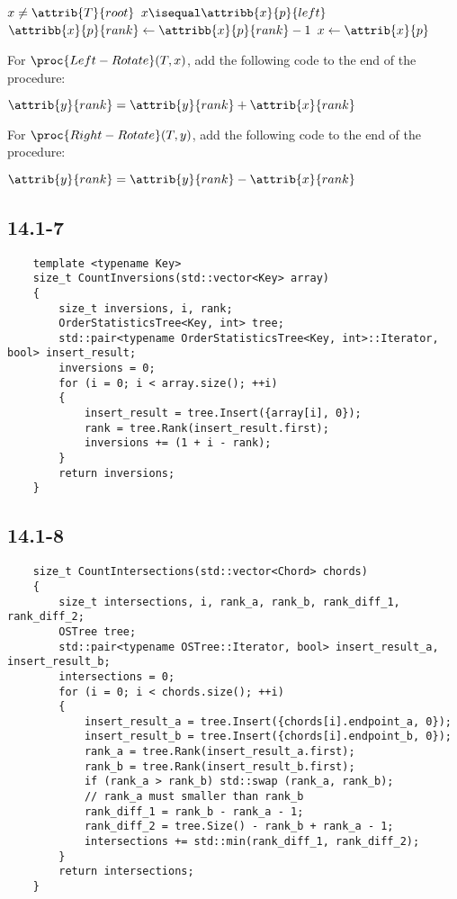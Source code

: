\begin{codebox}
    \li \While $x \neq \attrib{T}{root}$
    \li \Do
        \If $x \isequal \attribb{x}{p}{left}$
    \li \Then
            $\attribb{x}{p}{rank} \gets \attribb{x}{p}{rank} - 1$
        \End
    \li $x \gets \attrib{x}{p}$
        \End
\end{codebox}

\noindent
For $\proc{Left-Rotate}(T, x)$,
add the following code to the end of the procedure:

\begin{codebox}
    \zi $\attrib{y}{rank} = \attrib{y}{rank} + \attrib{x}{rank}$
\end{codebox}

\noindent
For $\proc{Right-Rotate}(T, y)$,
add the following code to the end of the procedure:

\begin{codebox}
    \zi $\attrib{y}{rank} = \attrib{y}{rank} - \attrib{x}{rank}$
\end{codebox}

\subsection*{14.1-7}

\begin{verbatim}
    template <typename Key>
    size_t CountInversions(std::vector<Key> array)
    {
        size_t inversions, i, rank;
        OrderStatisticsTree<Key, int> tree;
        std::pair<typename OrderStatisticsTree<Key, int>::Iterator, bool> insert_result;
        inversions = 0;
        for (i = 0; i < array.size(); ++i)
        {
            insert_result = tree.Insert({array[i], 0});
            rank = tree.Rank(insert_result.first);
            inversions += (1 + i - rank); 
        }
        return inversions;
    }
\end{verbatim}

\subsection*{14.1-8}

\begin{verbatim}
    size_t CountIntersections(std::vector<Chord> chords)
    {
        size_t intersections, i, rank_a, rank_b, rank_diff_1, rank_diff_2;
        OSTree tree;
        std::pair<typename OSTree::Iterator, bool> insert_result_a, insert_result_b;
        intersections = 0;
        for (i = 0; i < chords.size(); ++i)
        {
            insert_result_a = tree.Insert({chords[i].endpoint_a, 0});
            insert_result_b = tree.Insert({chords[i].endpoint_b, 0});
            rank_a = tree.Rank(insert_result_a.first);
            rank_b = tree.Rank(insert_result_b.first);
            if (rank_a > rank_b) std::swap (rank_a, rank_b);
            // rank_a must smaller than rank_b
            rank_diff_1 = rank_b - rank_a - 1;
            rank_diff_2 = tree.Size() - rank_b + rank_a - 1;
            intersections += std::min(rank_diff_1, rank_diff_2); 
        }
        return intersections;
    }
\end{verbatim}

